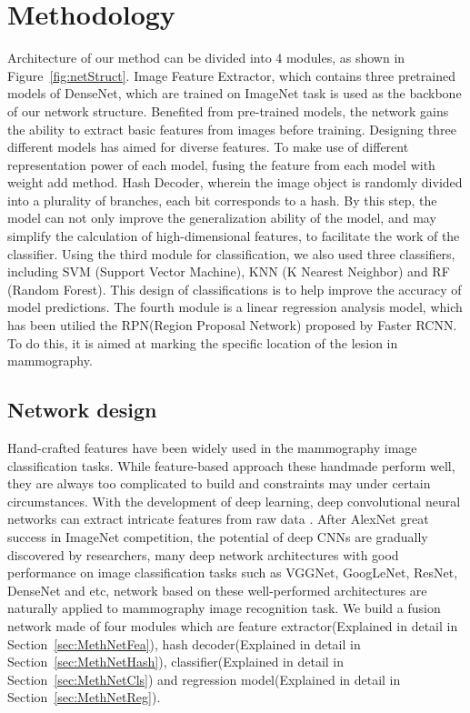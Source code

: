\section{Methodology}
\label{sec:Meth}

Architecture of our method can be divided into 
4 modules, as shown in
Figure~\ref{fig:netStruct}. 
Image Feature Extractor, 
which contains three pretrained models of 
DenseNet, which are trained on ImageNet task 
is used as the backbone of our network structure. 
Benefited from pre-trained models, the network 
gains the ability to extract basic features 
from images before training. 
Designing three different models has aimed for 
diverse features. 
To make use of different representation power 
of each model, fusing the feature from each 
model with weight add method.
Hash Decoder, wherein the image object 
is randomly divided into a plurality of 
branches, each bit corresponds to a hash. 
By this step, the model can not only improve 
the generalization ability of the model, and 
may simplify the calculation of high-dimensional 
features, to facilitate the work of the 
classifier.
Using the third module for classification, 
we also used three classifiers, including 
SVM (Support Vector Machine), KNN (K Nearest 
Neighbor) and RF (Random Forest).
This design of classifications is to help 
improve the accuracy of model predictions.
The fourth module is a linear regression 
analysis model, which has been utilied the 
RPN(Region Proposal Network) proposed by 
Faster RCNN. 
To do this, it is aimed at marking the specific 
location of the lesion in mammography.

\subsection{Network design}
\label{sec:MethNet}

Hand-crafted features have been widely used in 
the mammography image classification tasks. 
While feature-based approach these handmade 
perform well, they are always too complicated 
to build and constraints may under certain 
circumstances.
With the development of deep learning, deep 
convolutional neural networks can extract 
intricate features from raw data
\cite{Szegedy2016,Zeiler2014}.
After AlexNet great success in ImageNet 
competition, the potential of deep 
CNNs are gradually discovered by researchers, 
many deep network architectures with good 
performance on image classification tasks 
such as VGGNet, GoogLeNet, ResNet, DenseNet 
and etc, network based on these well-performed
architectures are naturally applied to 
mammography image recognition task. 
We build a fusion network made of four 
modules which are feature extractor(Explained 
in detail in 
Section~\ref{sec:MethNetFea}), 
hash decoder(Explained in detail in 
Section~\ref{sec:MethNetHash}),
classifier(Explained in detail in 
Section~\ref{sec:MethNetCls}) 
and regression model(Explained in detail in 
Section~\ref{sec:MethNetReg}). 

